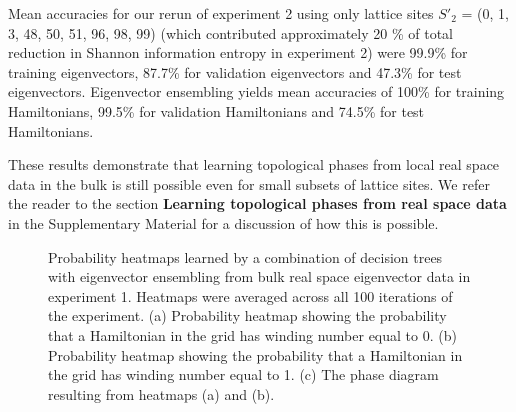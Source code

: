 \documentclass[fleqn,10pt]{wlscirep}
\begin{document}
Mean accuracies for our rerun of experiment 2 using only lattice sites $S'_2$ = (0, 1, 3, 48, 50, 51, 96, 98, 99) (which contributed approximately 20 \% of total reduction in Shannon information entropy in experiment 2) were 99.9\% for training eigenvectors, 87.7\% for validation eigenvectors and 47.3\% for test eigenvectors. Eigenvector ensembling yields mean accuracies of 100\% for training Hamiltonians, 99.5\% for validation Hamiltonians and 74.5\% for test Hamiltonians.  

These results demonstrate that learning topological phases from local real space data in the bulk is still possible even for small subsets of lattice sites. We refer the reader to the section \textbf{Learning topological phases from real space data} in the Supplementary Material for a discussion of how this is possible.

\begin{figure}
\centering
{}
\caption{Probability heatmaps learned by a combination of decision trees with eigenvector ensembling from bulk real space eigenvector data in experiment 1. Heatmaps were averaged across all 100 iterations of the experiment. (a) Probability heatmap showing the probability that a Hamiltonian in the grid has winding number equal to 0.  (b) Probability heatmap showing the probability that a Hamiltonian in the grid has winding number equal to 1. (c) The phase diagram resulting from heatmaps (a) and (b).}
\label{ssh1_heatmaps}
\end{figure}
\end{document}
